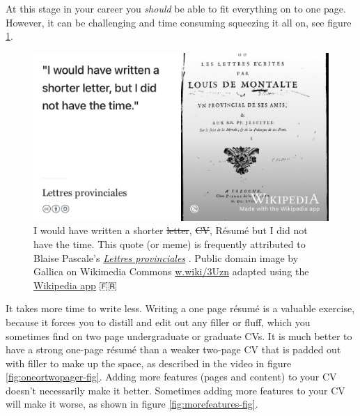 \documentclass[
]{book}
\begin{document}
At this stage in your career you \emph{should} be able to fit everything on to one page. However, it can be challenging and time consuming squeezing it all on, see figure \ref{fig:shorterletter-fig}.

\begin{figure}

{\centering \includegraphics[width=0.98\linewidth]{images/shorterletter} 

}

\caption{I would have written a shorter \sout{letter}, \sout{CV}, Résumé but I did not have the time. This quote (or meme) is frequently attributed to Blaise Pascale's \emph{\href{https://en.wikipedia.org/wiki/Lettres_provinciales}{Lettres provinciales}} \citep{shorterletter}. Public domain image by Gallica on Wikimedia Commons \href{https://w.wiki/3Uzn}{w.wiki/3Uzn} adapted using the \href{https://apps.apple.com/us/app/wikipedia/id324715238}{Wikipedia app} 🇫🇷}\label{fig:shorterletter-fig}
\end{figure}



It takes more time to write less. Writing a one page résumé is a valuable exercise, because it forces you to distill and edit out any filler or fluff, which you sometimes find on two page undergraduate or graduate CVs. It is much better to have a strong one-page résumé than a weaker two-page CV that is padded out with filler to make up the space, as described in the video in figure \ref{fig:oneortwopager-fig}. Adding more features (pages and content) to your CV doesn't necessarily make it better. Sometimes adding more features to your CV will make it worse, as shown in figure \ref{fig:morefeatures-fig}.
\end{document}
